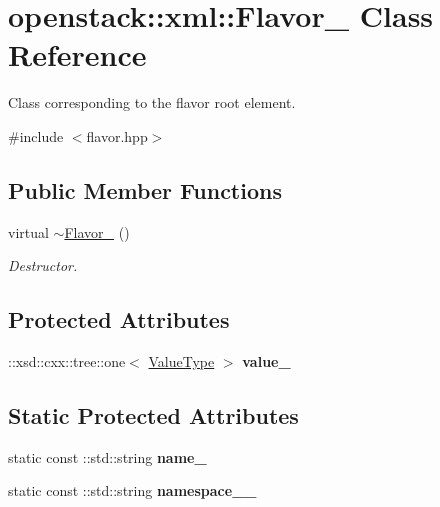 \hypertarget{classopenstack_1_1xml_1_1Flavor__}{
\section{openstack::xml::Flavor\_\- Class Reference}
\label{classopenstack_1_1xml_1_1Flavor__}
}


Class corresponding to the flavor root element.  




{\ttfamily \#include $<$flavor.hpp$>$}

\subsection*{Public Member Functions}
\begin{DoxyCompactItemize}
\item 
\hypertarget{classopenstack_1_1xml_1_1Flavor___a30bddea75270d962874d1ff4137ae8e7}{
virtual \hyperlink{classopenstack_1_1xml_1_1Flavor___a30bddea75270d962874d1ff4137ae8e7}{$\sim$Flavor\_\-} ()}
\label{classopenstack_1_1xml_1_1Flavor___a30bddea75270d962874d1ff4137ae8e7}

\begin{DoxyCompactList}\small\item\em Destructor. \item\end{DoxyCompactList}\end{DoxyCompactItemize}
\subsection*{Protected Attributes}
\begin{DoxyCompactItemize}
\item 
\hypertarget{classopenstack_1_1xml_1_1Flavor___a79ac29b2252647da6063ce7c9360d836}{
::xsd::cxx::tree::one$<$ \hyperlink{classopenstack_1_1xml_1_1Flavor}{ValueType} $>$ {\bfseries value\_\-}}
\label{classopenstack_1_1xml_1_1Flavor___a79ac29b2252647da6063ce7c9360d836}

\end{DoxyCompactItemize}
\subsection*{Static Protected Attributes}
\begin{DoxyCompactItemize}
\item 
\hypertarget{classopenstack_1_1xml_1_1Flavor___af34f3a9425996efc4e14fe213a70f2f6}{
static const ::std::string {\bfseries name\_\-}}
\label{classopenstack_1_1xml_1_1Flavor___af34f3a9425996efc4e14fe213a70f2f6}

\item 
\hypertarget{classopenstack_1_1xml_1_1Flavor___a3ebfec54bbdf7e8216e114dc74cc7373}{
static const ::std::string {\bfseries namespace\_\-\_\-}}
\label{classopenstack_1_1xml_1_1Flavor___a3ebfec54bbdf7e8216e114dc74cc7373}

\end{DoxyCompactItemize}
